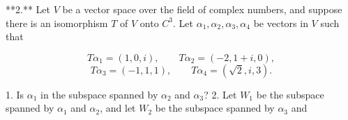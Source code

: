 

**2.** Let \(V\) be a vector space over the field of complex numbers, and suppose there is an isomorphism \(T\) of \(V\) onto \(C^{3}\). Let \(\alpha_{1},\alpha_{2},\alpha_{3},\alpha_{4}\) be vectors in \(V\) such that

\[T\alpha_{1} = (1,0,i),\qquad T\alpha_{2}=(-2,1+i,0),\] \[T\alpha_{3} = (-1,1,1),\qquad T\alpha_{4}=(\sqrt{2},i,3).\]

1. Is \(\alpha_{1}\) in the subspace spanned by \(\alpha_{2}\) and \(\alpha_{3}\)?
2. Let \(W_{1}\) be the subspace spanned by \(\alpha_{1}\) and \(\alpha_{2}\), and let \(W_{2}\) be the subspace spanned by \(\alpha_{3}\) and \